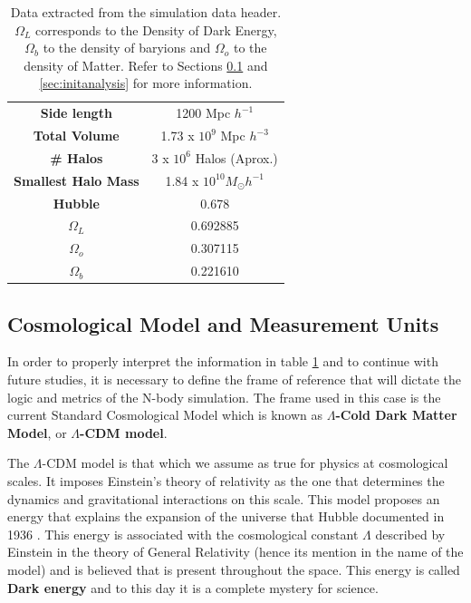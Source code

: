 \documentclass[a4paper,fleqn,usenatbib]{mnras}
\begin{document}
\begin{table}[H]
    \centering
    \begin{tabular}{|c|c|}
    \hline
    
        \textbf{Side length} & 1200 Mpc $h^{-1}$ \\
        \textbf{Total Volume} & 1.73 x $10^9$ Mpc  $h^{-3}$\\
        \textbf{\# Halos} &  3 x $10^6$ Halos (Aprox.)\\
        \textbf{Smallest Halo Mass} & 1.84 x $10^{10} M_{\odot} h^{-1} $\\
        \textbf{Hubble} & 0.678\\
        $\Omega_L$ & 0.692885 \\
        $\Omega_o$ & 0.307115\\
        $\Omega_b$ & 0.221610\\
        
        
    \hline
    \end{tabular}
    \caption{Data extracted from the simulation data header. $\Omega_L$ corresponds to the Density of Dark Energy, $\Omega_b$ to the density of baryions and $\Omega_o$ to the density of Matter. Refer to Sections \ref{sec:units} and \ref{sec:initanalysis} for more information.}
    \label{tab:InitCondInfo}
\end{table}

\subsection{Cosmological Model and Measurement Units}
\label{sec:units}
In order to properly interpret the information in table \ref{tab:InitCondInfo} and to continue with future studies, it is necessary to define the frame of reference that will dictate the logic and metrics of the N-body simulation. The frame used in this case is the current Standard Cosmological Model which is known as \textbf{$\Lambda$-Cold Dark Matter Model}, or \textbf{$\Lambda$-CDM model}. 

The $\Lambda$-CDM model is that which we assume as true for physics at cosmological scales. It imposes Einstein's theory of relativity as the one that determines the dynamics and gravitational interactions on this scale. This model proposes an energy that explains the expansion of the universe that Hubble documented in 1936 \cite{Hubble}. This energy is associated with the cosmological constant \textbf{$\Lambda$} described by Einstein in the theory of General Relativity (hence its mention in the name of the model) and is believed that is present throughout the space. This energy is called \textbf{Dark energy} and to this day it is a complete mystery for science.
\end{document}
